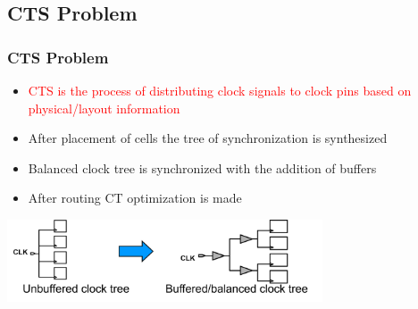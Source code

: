 \documentclass[compress]{beamer}
\begin{document}
\subsection[CTS]{CTS Problem}
\begin{frame}
	\frametitle{CTS Problem}
		\begin{itemize}
			\item \textcolor{red}{CTS is the process of distributing clock signals to clock pins based on physical/layout information}
			\item After placement of cells the tree of synchronization is synthesized
			\item Balanced clock tree is synchronized with the addition of buffers
			\item After routing CT optimization is made
		\end{itemize}
		
		\begin{center}
			\includegraphics[width=0.7\textwidth]{CTS}
		\end{center}
	
\end{frame}
\end{document}
